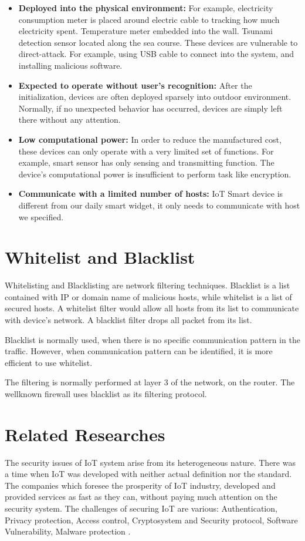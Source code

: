\begin{itemize}
    \item \textbf{Deployed into the physical environment:} For example, electricity consumption meter is placed around electric cable to tracking how much electricity spent. Temperature meter embedded into the wall. Tsunami detection sensor located along the sea course. These devices are vulnerable to direct-attack. For example, using USB cable to connect into the system, and installing malicious software. 
    \item \textbf{Expected to operate without user’s recognition:}     After the initialization, devices are often deployed sparsely into outdoor environment. Normally, if no unexpected behavior has occurred, devices are simply left there without any attention.
    \item \textbf{Low computational power:}     In order to reduce the manufactured cost, these devices can only operate with a very limited set of functions. For example, smart sensor has only sensing and transmitting function. The device's computational power is insufficient to perform task like encryption. 
    \item \textbf{Communicate with a limited number of hosts:} IoT Smart device is different from our daily smart widget, it only needs to communicate with host we specified. 
\end{itemize}

\section{Whitelist and Blacklist}
Whitelisting and Blacklisting are network filtering techniques. Blacklist is a list contained with IP or domain name of malicious hosts, while whitelist is a list of secured hosts. A whitelist filter would allow all hosts from its list to communicate with device's network. A blacklist filter drops all packet from its list.  

Blacklist is normally used, when there is no specific communication pattern in the traffic. However, when communication pattern can be identified, it is more efficient to use whitelist.

The filtering is normally performed at layer 3 of the network, on the router. The wellknown firewall uses blacklist as its filtering protocol.


\section{Related Researches}
The security issues of IoT system arise from its heterogeneous nature. There was a time when IoT was developed with neither actual definition nor the standard. The companies which foresee the prosperity of IoT industry, developed and provided services as fast as they can, without paying much attention on the security system. The challenges of securing IoT are various: Authentication, Privacy protection, Access control, Cryptosystem and Security protocol, Software Vulnerability, Malware protection \cite{ISSUE1}\cite{ISSUE2}. 

